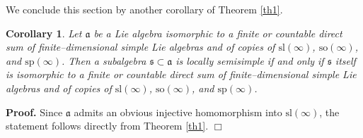 \documentclass[oneside,leqno,12pt]{article}
\newcounter{theorem}
\newtheorem{corollary}[theo]{Corollary}
\newenvironment{proof}{ \noindent \textbf{Proof.}}{\hfill $\Box$}
\def\ga{\mathfrak{a}}
\renewcommand{\ss}{\mathfrak{s}}
\newcommand{\refth}[1]{Theorem \ref{#1}}
\renewcommand{\sp}{\mathrm{sp}}
\renewcommand{\sl}{\mathrm{sl}}
\newcommand{\so}{\mathrm{so}}
\begin{document}
We conclude this section by another corollary of \refth{th1}. 
\begin{corollary}\label{thGeneralth1} 
Let $\ga$ be a Lie algebra isomorphic to a finite or countable direct sum of finite--dimensional simple Lie algebras and of 
copies of $\sl(\infty)$, $\so(\infty)$, and $\sp(\infty)$. Then a subalgebra $\ss\subset\ga$ is locally semisimple if and only if $\ss$ itself is isomorphic to a finite or countable direct sum of finite--dimensional simple Lie algebras and of 
copies of $\sl(\infty)$, $\so(\infty)$, and $\sp(\infty)$. 
\end{corollary}

\begin{proof}
Since $\ga$ admits an obvious injective homomorphism into $\sl(\infty)$, the statement follows directly from Theorem \ref{th1}.
\end{proof}
\end{document}

